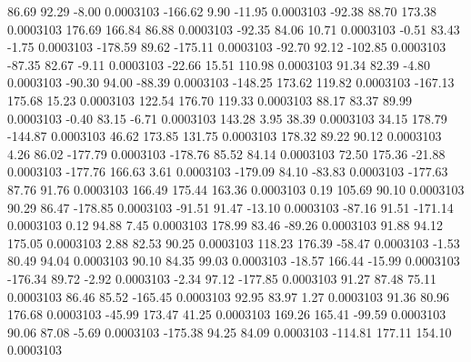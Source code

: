        86.69       92.29       -8.00     0.0003103
     -166.62        9.90      -11.95     0.0003103
      -92.38       88.70      173.38     0.0003103
      176.69      166.84       86.88     0.0003103
      -92.35       84.06       10.71     0.0003103
       -0.51       83.43       -1.75     0.0003103
     -178.59       89.62     -175.11     0.0003103
      -92.70       92.12     -102.85     0.0003103
      -87.35       82.67       -9.11     0.0003103
      -22.66       15.51      110.98     0.0003103
       91.34       82.39       -4.80     0.0003103
      -90.30       94.00      -88.39     0.0003103
     -148.25      173.62      119.82     0.0003103
     -167.13      175.68       15.23     0.0003103
      122.54      176.70      119.33     0.0003103
       88.17       83.37       89.99     0.0003103
       -0.40       83.15       -6.71     0.0003103
      143.28        3.95       38.39     0.0003103
       34.15      178.79     -144.87     0.0003103
       46.62      173.85      131.75     0.0003103
      178.32       89.22       90.12     0.0003103
        4.26       86.02     -177.79     0.0003103
     -178.76       85.52       84.14     0.0003103
       72.50      175.36      -21.88     0.0003103
     -177.76      166.63        3.61     0.0003103
     -179.09       84.10      -83.83     0.0003103
     -177.63       87.76       91.76     0.0003103
      166.49      175.44      163.36     0.0003103
        0.19      105.69       90.10     0.0003103
       90.29       86.47     -178.85     0.0003103
      -91.51       91.47      -13.10     0.0003103
      -87.16       91.51     -171.14     0.0003103
        0.12       94.88        7.45     0.0003103
      178.99       83.46      -89.26     0.0003103
       91.88       94.12      175.05     0.0003103
        2.88       82.53       90.25     0.0003103
      118.23      176.39      -58.47     0.0003103
       -1.53       80.49       94.04     0.0003103
       90.10       84.35       99.03     0.0003103
      -18.57      166.44      -15.99     0.0003103
     -176.34       89.72       -2.92     0.0003103
       -2.34       97.12     -177.85     0.0003103
       91.27       87.48       75.11     0.0003103
       86.46       85.52     -165.45     0.0003103
       92.95       83.97        1.27     0.0003103
       91.36       80.96      176.68     0.0003103
      -45.99      173.47       41.25     0.0003103
      169.26      165.41      -99.59     0.0003103
       90.06       87.08       -5.69     0.0003103
     -175.38       94.25       84.09     0.0003103
     -114.81      177.11      154.10     0.0003103
